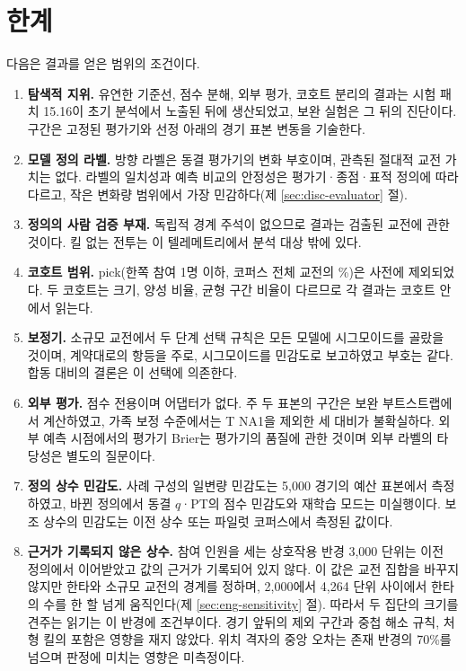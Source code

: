 \section{한계}
\label{sec:disc-limitations}

다음은 결과를 얻은 범위의 조건이다.

\begin{enumerate}[leftmargin=2em]
  \item \textbf{탐색적 지위.} 유연한 기준선, 점수 분해, 외부 평가, 코호트 분리의 결과는 시험 패치 15.16이 초기 분석에서 노출된 뒤에 생산되었고, 보완 실험은 그 뒤의 진단이다. 구간은 고정된 평가기와 선정 아래의 경기 표본 변동을 기술한다.
  \item \textbf{모델 정의 라벨.} 방향 라벨은 동결 평가기의 변화 부호이며, 관측된 절대적 교전 가치는 없다. 라벨의 일치성과 예측 비교의 안정성은 평가기·종점·표적 정의에 따라 다르고, 작은 변화량 범위에서 가장 민감하다(제 \ref{sec:disc-evaluator} 절).
  \item \textbf{정의의 사람 검증 부재.} 독립적 경계 주석이 없으므로 결과는 검출된 교전에 관한 것이다. 킬 없는 전투는 이 텔레메트리에서 분석 대상 밖에 있다.
  \item \textbf{코호트 범위.} pick(한쪽 참여 1명 이하, 코퍼스 전체 교전의 \censusShareP\%)은 사전에 제외되었다. 두 코호트는 크기, 양성 비율, 균형 구간 비율이 다르므로 각 결과는 코호트 안에서 읽는다.
  \item \textbf{보정기.} 소규모 교전에서 두 단계 선택 규칙은 모든 모델에 시그모이드를 골랐을 것이며, 계약대로의 항등을 주로, 시그모이드를 민감도로 보고하였고 부호는 같다. 합동 대비의 결론은 이 선택에 의존한다.
  \item \textbf{외부 평가.} 점수 전용이며 어댑터가 없다. 주 두 표본의 구간은 보완 부트스트랩에서 계산하였고, 가족 보정 수준에서는 T NA1을 제외한 세 대비가 불확실하다. 외부 예측 시점에서의 평가기 Brier는 평가기의 품질에 관한 것이며 외부 라벨의 타당성은 별도의 질문이다.
  \item \textbf{정의 상수 민감도.} 사례 구성의 일변량 민감도는 5{,}000 경기의 예산 표본에서 측정하였고, 바뀐 정의에서 동결 $q$·PT의 점수 민감도와 재학습 모드는 미실행이다. 보조 상수의 민감도는 이전 상수 또는 파일럿 코퍼스에서 측정된 값이다.
  \item \textbf{근거가 기록되지 않은 상수.} 참여 인원을 세는 상호작용 반경 3{,}000 단위는 이전 정의에서 이어받았고 값의 근거가 기록되어 있지 않다. 이 값은 교전 집합을 바꾸지 않지만 한타와 소규모 교전의 경계를 정하며, 2{,}000에서 4{,}264 단위 사이에서 한타의 수를 한 할 넘게 움직인다(제 \ref{sec:eng-sensitivity} 절). 따라서 두 집단의 크기를 견주는 읽기는 이 반경에 조건부이다. 경기 앞뒤의 제외 구간과 중첩 해소 규칙, 처형 킬의 포함은 영향을 재지 않았다. 위치 격자의 중앙 오차는 존재 반경의 70\%를 넘으며 판정에 미치는 영향은 미측정이다.

\end{enumerate}

